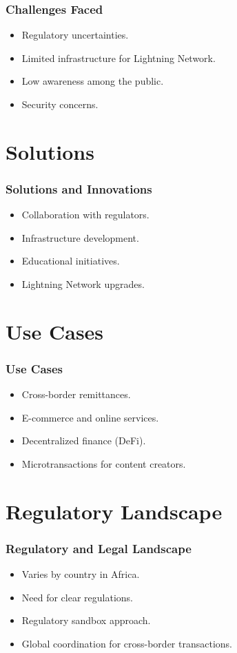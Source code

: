 \documentclass[aspectratio=169]{beamer}
\begin{document}
\begin{frame}
\frametitle{Challenges Faced}
\begin{itemize}
    \item Regulatory uncertainties.
    \item Limited infrastructure for Lightning Network.
    \item Low awareness among the public.
    \item Security concerns.
\end{itemize}
\end{frame}

\section{Solutions}

\begin{frame}
\frametitle{Solutions and Innovations}
\begin{itemize}
    \item Collaboration with regulators.
    \item Infrastructure development.
    \item Educational initiatives.
    \item Lightning Network upgrades.
\end{itemize}
\end{frame}

\section{Use Cases}

\begin{frame}
\frametitle{Use Cases}
\begin{itemize}
    \item Cross-border remittances.
    \item E-commerce and online services.
    \item Decentralized finance (DeFi).
    \item Microtransactions for content creators.
\end{itemize}
\end{frame}

\section{Regulatory Landscape}

\begin{frame}
\frametitle{Regulatory and Legal Landscape}
\begin{itemize}
    \item Varies by country in Africa.
    \item Need for clear regulations.
    \item Regulatory sandbox approach.
    \item Global coordination for cross-border transactions.
\end{itemize}
\end{frame}
\end{document}
